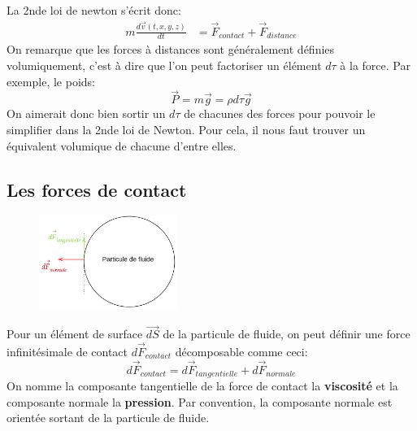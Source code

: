 \documentclass[a4paper,10pt]{report}
\begin{document}
La 2nde loi de newton s'écrit donc:
\begin{align*}
m \frac{d\vec{v}(t,x,y,z)}{dt} &= \vec{F}_{contact} + \vec{F}_{distance}
\end{align*}
 On remarque que les forces à distances sont généralement définies volumiquement, c'est à dire que l'on peut factoriser un élément $d\tau$ à la force. Par exemple, le poids:
 $$\vec{P} = m\vec{g} = \rho d\tau \vec{g}$$
 On aimerait donc bien sortir un $d\tau$ de chacunes des forces pour pouvoir le simplifier dans la 2nde loi de Newton. Pour cela, il nous faut trouver un équivalent volumique de chacune d'entre elles.

 \subsection{Les forces de contact}

\begin{figure}
 \includegraphics[width=0.4\textwidth]{force_de_contact_particule_de_fluide}
\end{figure}
Pour un élément de surface $\vec{dS}$ de la particule de fluide, on peut définir une force infinitésimale de contact $d\vec{F}_{contact}$ décomposable comme ceci:
$$d\vec{F}_{contact} = d\vec{F}_{tangentielle} + d\vec{F}_{normale}$$
On nomme la composante tangentielle de la force de contact la \textbf{viscosité} et la composante normale la \textbf{pression}. Par convention, la composante normale est orientée sortant de la particule de fluide.
\\
\\
\\
\newpage
\end{document}
